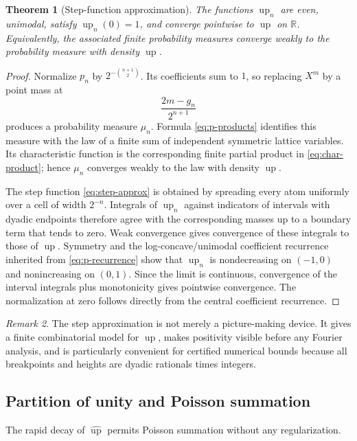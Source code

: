 \documentclass[11pt]{article}
\numberwithin{equation}{section}
\newtheorem{theorem}{Theorem}[section]
\theoremstyle{definition}
\theoremstyle{remark}
\newtheorem{remark}[theorem]{Remark}
\newcommand{\R}{\mathbb{R}}
\newcommand{\upf}{\operatorname{up}}
\begin{document}
\begin{theorem}[Step-function approximation]\label{thm:step-approx}
The functions $\upf_n$ are even, unimodal, satisfy $\upf_n(0)=1$, and
converge pointwise to $\upf$ on $\R$.  Equivalently, the associated finite
probability measures converge weakly to the probability measure with density
$\upf$.
\end{theorem}

\begin{proof}
Normalize $p_n$ by $2^{-\binom{n+1}{2}}$.  Its coefficients sum to $1$, so
replacing $X^m$ by a point mass at
\[
 \frac{2m-g_n}{2^{n+1}}
\]
produces a probability measure $\mu_n$.  Formula \eqref{eq:p-products}
identifies this measure with the law of a finite sum of independent symmetric
lattice variables.  Its characteristic function is the corresponding finite
partial product in \eqref{eq:char-product}; hence $\mu_n$ converges weakly to
the law with density $\upf$.

The step function \eqref{eq:step-approx} is obtained by spreading every atom
uniformly over a cell of width $2^{-n}$.  Integrals of $\upf_n$ against
indicators of intervals with dyadic endpoints therefore agree with the
corresponding masses up to a boundary term that tends to zero.  Weak
convergence gives convergence of these integrals to those of $\upf$.
Symmetry and the log-concave/unimodal coefficient recurrence inherited from
\eqref{eq:p-recurrence} show that $\upf_n$ is nondecreasing on $(-1,0)$ and
nonincreasing on $(0,1)$.  Since the limit is continuous, convergence of the
interval integrals plus monotonicity gives pointwise convergence.  The
normalization at zero follows directly from the central coefficient
recurrence.
\end{proof}

\begin{remark}
The step approximation is not merely a picture-making device.  It gives a
finite combinatorial model for $\upf$, makes positivity visible before any
Fourier analysis, and is particularly convenient for certified numerical
bounds because all breakpoints and heights are dyadic rationals times
integers.
\end{remark}

\subsection{Partition of unity and Poisson summation}

The rapid decay of $\widehat{\upf}$ permits Poisson summation without any
regularization.
\end{document}
